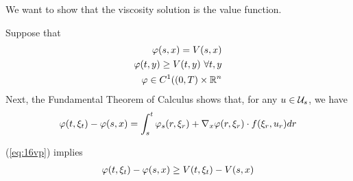 We want to show that the viscosity solution is the value function.

Suppose that
\begin{align}
\label{eq:16vp}
\begin{split}
\varphi(s,x)=V(s,x) \\
\varphi(t,y)\geq V(t,y) ~\forall t,y \\
\varphi\in C^1((0,T)\times\mathbb{R}^n
\end{split}
\end{align}
Next, the Fundamental Theorem of Calculus shows that, for any $u\in\mathcal{U}_s$, we have
\begin{align}
\label{eq:16fund}
\varphi(t,\xi_t)-\varphi(s,x) = \int_s^t\varphi_s(r,\xi_r)+\nabla_x\varphi(r,\xi_r)\cdot f(\xi_r,u_r)dr
\end{align}

(\ref{eq:16vp}) implies
\begin{align}
\label{eq:16vpv}
\varphi(t,\xi_t)-\varphi(s,x)\geq V(t,\xi_t)-V(s,x)
\end{align}

